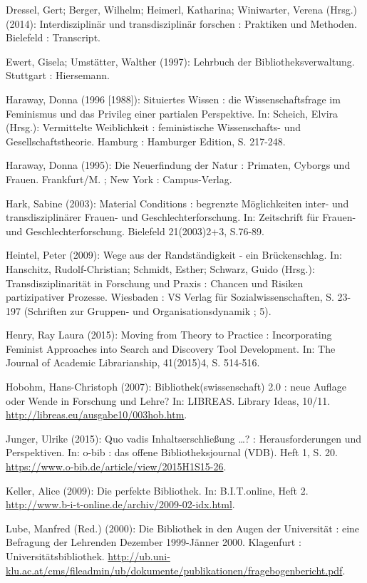 Dressel, Gert; Berger, Wilhelm; Heimerl, Katharina; Winiwarter, Verena
(Hrsg.) (2014): Interdisziplinär und transdisziplinär forschen :
Praktiken und Methoden. Bielefeld : Transcript.

Ewert, Gisela; Umstätter, Walther (1997): Lehrbuch der
Bibliotheksverwaltung. Stuttgart : Hiersemann.

Haraway, Donna (1996 {[}1988{]}): Situiertes Wissen : die
Wissenschaftsfrage im Feminismus und das Privileg einer partialen
Perspektive. In: Scheich, Elvira (Hrsg.): Vermittelte Weiblichkeit :
feministische Wissenschafts- und Gesellschaftstheorie. Hamburg :
Hamburger Edition, S. 217-248.

Haraway, Donna (1995): Die Neuerfindung der Natur : Primaten, Cyborgs
und Frauen. Frankfurt/M. ; New York : Campus-Verlag.

Hark, Sabine (2003): Material Conditions : begrenzte Möglichkeiten
inter- und transdisziplinärer Frauen- und Geschlechterforschung. In:
Zeitschrift für Frauen- und Geschlechterforschung. Bielefeld
21(2003)2+3, S.76-89.

Heintel, Peter (2009): Wege aus der Randständigkeit - ein Brückenschlag.
In: Hanschitz, Rudolf-Christian; Schmidt, Esther; Schwarz, Guido
(Hrsg.): Transdisziplinarität in Forschung und Praxis : Chancen und
Risiken partizipativer Prozesse. Wiesbaden : VS Verlag für
Sozialwissenschaften, S. 23-197 (Schriften zur Gruppen- und
Organisationsdynamik ; 5).

Henry, Ray Laura (2015): Moving from Theory to Practice : Incorporating
Feminist Approaches into Search and Discovery Tool Development. In: The
Journal of Academic Librarianship, 41(2015)4, S. 514-516.

Hobohm, Hans-Christoph (2007): Bibliothek(swissenschaft) 2.0 : neue
Auflage oder Wende in Forschung und Lehre? In: LIBREAS. Library Ideas,
10/11. \url{http://libreas.eu/ausgabe10/003hob.htm}.

Junger, Ulrike (2015): Quo vadis Inhaltserschließung \ldots{}? :
Herausforderungen und Perspektiven. In: o-bib : das offene
Bibliotheksjournal (VDB). Heft 1, S. 20.
\url{https://www.o-bib.de/article/view/2015H1S15-26}.

Keller, Alice (2009): Die perfekte Bibliothek. In: B.I.T.online, Heft 2.
\url{http://www.b-i-t-online.de/archiv/2009-02-idx.html}.

Lube, Manfred (Red.) (2000): Die Bibliothek in den Augen der
Universität : eine Befragung der Lehrenden Dezember 1999-Jänner 2000. Klagenfurt : Universitätsbibliothek.
\url{http://ub.uni-klu.ac.at/cms/fileadmin/ub/dokumente/publikationen/fragebogenbericht.pdf}.

